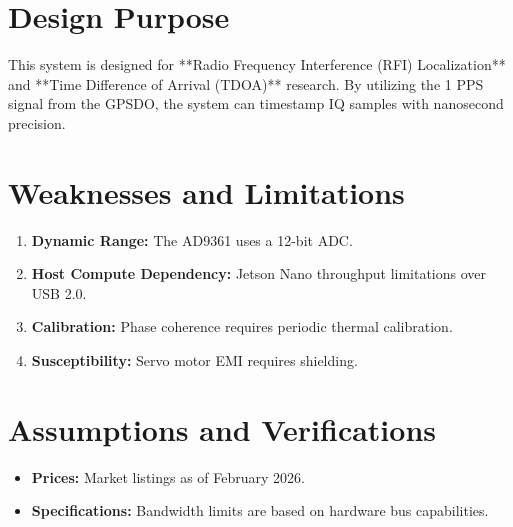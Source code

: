 \documentclass{article}
\begin{document}
\section{Design Purpose}
This system is designed for **Radio Frequency Interference (RFI) Localization** and **Time Difference of Arrival (TDOA)** research. By utilizing the 1 PPS signal from the GPSDO, the system can timestamp IQ samples with nanosecond precision.

\section{Weaknesses and Limitations}
\begin{enumerate}
    \item \textbf{Dynamic Range:} The AD9361 uses a 12-bit ADC.
    \item \textbf{Host Compute Dependency:} Jetson Nano throughput limitations over USB 2.0.
    \item \textbf{Calibration:} Phase coherence requires periodic thermal calibration.
    \item \textbf{Susceptibility:} Servo motor EMI requires shielding.
\end{enumerate}

\section{Assumptions and Verifications}
\begin{itemize}
    \item \textbf{Prices:} Market listings as of February 2026.
    \item \textbf{Specifications:} Bandwidth limits are based on hardware bus capabilities.
\end{itemize}
\end{document}
